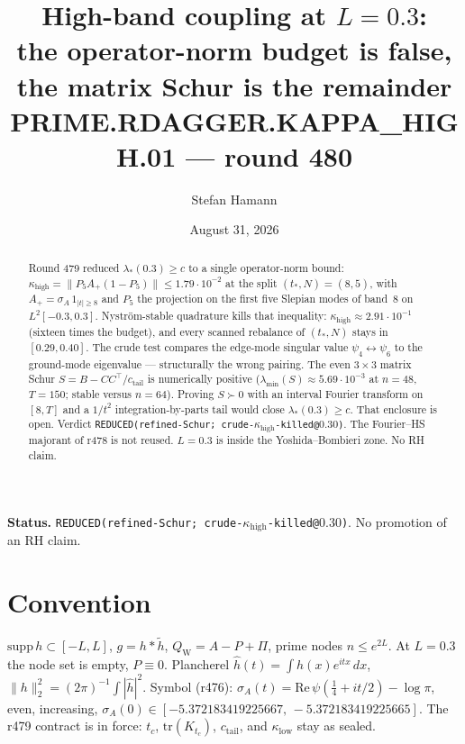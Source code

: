 \documentclass[11pt]{article}
\title{\bfseries High-band coupling at $L=0.3$:\\[2mm]
the operator-norm budget is false,\\[1mm]
the matrix Schur is the remainder\\[2mm]
\large PRIME.RDAGGER.KAPPA\_HIGH.01 --- round 480}
\author{Stefan Hamann}
\date{August 31, 2026}
\theoremstyle{remark}
\newcommand{\QW}{Q_{\mathrm W}}
\begin{document}
\maketitle

\begin{abstract}\noindent
Round 479 reduced $\lambda_*(0.3)\ge c$ to a single operator-norm
bound: $\kappa_{\mathrm{high}}=\|P_5A_+(1-P_5)\|\le1.79\cdot10^{-2}$
at the split $(t_*,N)=(8,5)$, with
$A_+=\sigma_A\,1_{|t|\ge8}$ and $P_5$ the projection on the first
five Slepian modes of band~$8$ on $L^2[-0.3,0.3]$.
Nystr\"om-stable quadrature kills that inequality:
$\kappa_{\mathrm{high}}\approx2.91\cdot10^{-1}$
(sixteen times the budget), and every scanned rebalance of
$(t_*,N)$ stays in $[0.29,0.40]$.
The crude test compares the edge-mode singular value
$\psi_4\leftrightarrow\psi_6$ to the ground-mode eigenvalue ---
structurally the wrong pairing.
The even $3\times3$ matrix Schur
$S=B-CC^\top/c_{\mathrm{tail}}$ is numerically positive
($\lambda_{\min}(S)\approx5.69\cdot10^{-3}$ at $n=48$, $T=150$;
stable versus $n=64$).
Proving $S\succ0$ with an interval Fourier transform on $[8,T]$
and a $1/t^2$ integration-by-parts tail would close
$\lambda_*(0.3)\ge c$.
That enclosure is open.
Verdict \texttt{REDUCED(refined-Schur; crude-$\kappa_{\mathrm{high}}$-killed@$0.30$)}.
The Fourier--HS majorant of r478 is not reused.
$L=0.3$ is inside the Yoshida--Bombieri zone.
No RH claim.
\end{abstract}

\medskip\noindent
\textbf{Status.}\enspace
\texttt{REDUCED(refined-Schur; crude-$\kappa_{\mathrm{high}}$-killed@$0.30$)}.
No promotion of an RH claim.

\begin{center}
\end{center}

\section{Convention}

$\mathrm{supp}\,h\subset[-L,L]$, $g=h*\widetilde h$,
$\QW=A-P+\Pi$, prime nodes $n\le e^{2L}$.
At $L=0.3$ the node set is empty, $P\equiv0$.
Plancherel $\hat h(t)=\int h(x)e^{itx}\,dx$,
$\|h\|_2^2=(2\pi)^{-1}\int|\hat h|^2$.
Symbol (r476):
$\sigma_A(t)=\mathrm{Re}\,\psi(\tfrac14+it/2)-\log\pi$,
even, increasing,
$\sigma_A(0)\in[-5.372183419225667,\,-5.372183419225665]$.
The r479 contract is in force: $t_c$, $\mathrm{tr}(K_{t_c})$,
$c_{\mathrm{tail}}$, and $\kappa_{\mathrm{low}}$ stay as sealed.
\end{document}
